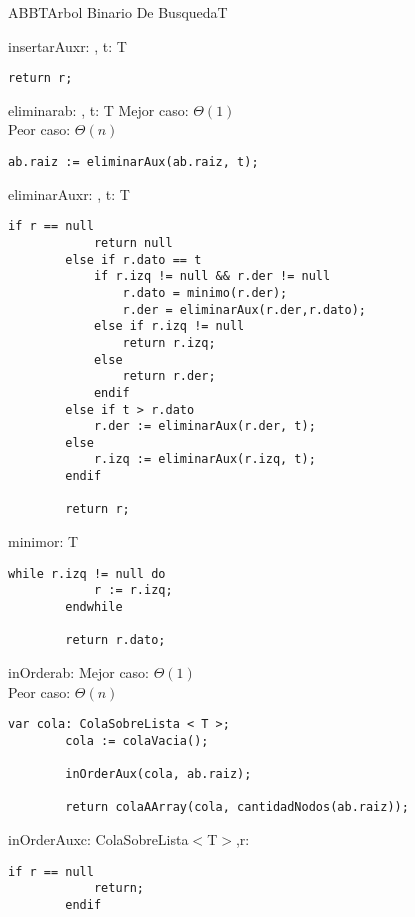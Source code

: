 \begin{module}{ABB}{T}{Arbol Binario De Busqueda}{T}
\begin{proc}{insertarAux}{\Inout r: \nodo, \In t: T}{\nodo}
\begin{lstlisting}[numbers=none,frame=none]
		return r;
		\end{lstlisting}
	\end{proc}

	\begin{proc}{eliminar}{\Inout ab: \moduletype, \In t: T}{}
		Mejor caso: $\Theta(1)$\\
		Peor caso: $\Theta(n)$
		\begin{lstlisting}[numbers=none,frame=none]
		ab.raiz := eliminarAux(ab.raiz, t);
		\end{lstlisting}
	\end{proc}

	\begin{proc}{eliminarAux}{\Inout r: \nodo, \In t: T}{\nodo}
		\begin{lstlisting}[numbers=none,frame=none]
		if r == null
			return null
		else if r.dato == t
			if r.izq != null && r.der != null
				r.dato = minimo(r.der);
				r.der = eliminarAux(r.der,r.dato);
			else if r.izq != null
				return r.izq;
			else
				return r.der;
			endif
		else if t > r.dato
			r.der := eliminarAux(r.der, t);
		else
			r.izq := eliminarAux(r.izq, t);
		endif

		return r;
		\end{lstlisting}
	\end{proc}

	\begin{proc}{minimo}{\In r: \nodo}{T}
		\begin{lstlisting}[numbers=none,frame=none]
		while r.izq != null do
			r := r.izq;
		endwhile

		return r.dato;
		\end{lstlisting}
	\end{proc}

	\begin{proc}{inOrder}{\In ab: \moduletype}{}
		Mejor caso: $\Theta(1)$\\
		Peor caso: $\Theta(n)$
		\begin{lstlisting}[numbers=none,frame=none]
		var cola: ColaSobreLista < T >;
		cola := colaVacia();

		inOrderAux(cola, ab.raiz);

		return colaAArray(cola, cantidadNodos(ab.raiz));
		\end{lstlisting}
	\end{proc}

	\begin{proc}{inOrderAux}{\Inout c: ColaSobreLista$<$T$>$,\In r: \nodo}{}
		\begin{lstlisting}[numbers=none,frame=none]
		if r == null
			return;
		endif


\end{lstlisting}
\end{proc}
\end{module}

